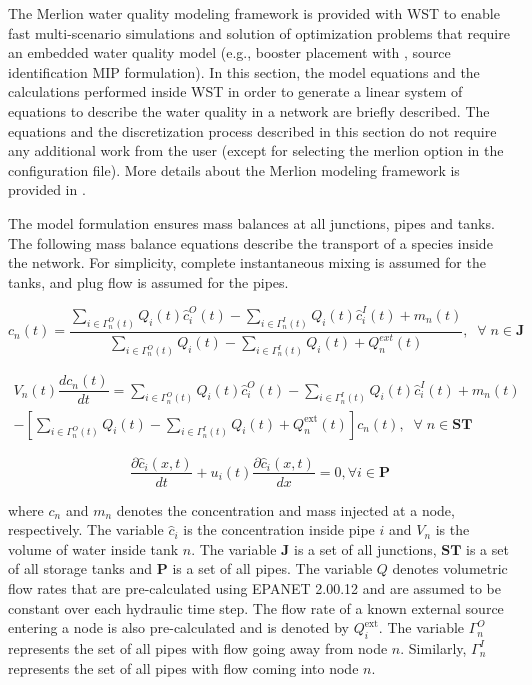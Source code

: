 The Merlion water quality modeling framework is provided with WST to enable
fast multi-scenario simulations and solution of optimization problems that require
an embedded water quality model (e.g., booster placement with , source identification MIP formulation). 
In this section, the model equations and the calculations performed inside WST 
in order to generate a linear system of equations to describe the water
quality in a network are briefly described. The equations and the discretization process described in 
this section do not require any additional work from the user (except for selecting the merlion 
option in the configuration file). More details about the Merlion modeling framework is provided in \citep{Merlion12}.   
      
The model formulation ensures mass balances
at all junctions, pipes and tanks. The following mass balance equations
describe the transport of a species inside the network. For simplicity,
complete instantaneous mixing is assumed for the tanks, and plug flow
is assumed for the pipes.

\bigskip{}

\begin{equation}
c_{n}(t)=\dfrac{\sum_{i\in\Gamma_{n}^{O}(t)}Q_{i}(t)\hat{c}_{i}^{O}(t)-\sum_{i\in\Gamma_{n}^{I}(t)}Q_{i}(t)\hat{c}_{i}^{I}(t)+m_{n}(t)}{\sum_{i\in\Gamma_{n}^{O}(t)}Q_{i}(t)-\sum_{i\in\Gamma_{n}^{I}(t)}Q_{i}(t)+Q_{n}^{ext}(t)},\;\;\forall\;
n\in\mathbf{J} \label{eq:junctionbalance}
\end{equation}

\medskip{}

\begin{multline}
V_{n}(t)\dfrac{dc_{n}(t)}{dt}=\sum_{i\in\Gamma_{n}^{O}(t)}Q_{i}(t)\hat{c}_{i}^{O}(t)-\sum_{i\in\Gamma_{n}^{I}(t)}Q_{i}(t)\hat{c}_{i}^{I}(t)+m_{n}(t)\\
-\left[\sum_{i\in\Gamma_{n}^{O}(t)}Q_{i}(t)-\sum_{i\in\Gamma_{n}^{I}(t)}Q_{i}(t)+Q_{n}^{\mathrm{ext}}(t)\right]c_{n}(t),\;\;\forall\; n\in\mathbf{ST}\label{eq:tankbalance}
\end{multline}

\bigskip{}

\begin{equation}
\dfrac{\partial\hat{c}_{i}(x,t)}{dt}+u_{i}(t)\dfrac{\partial\hat{c}_{i}(x,t)}{dx}=0,\forall i\in\mathbf{P}\label{eq:pipebalance}
\end{equation}

where $c_{n}$ and $m_{n}$ denotes the concentration and mass injected at a node,
respectively. The variable $\hat{c}_{i}$ is the concentration inside pipe $i$ 
and $V_{n}$ is the volume of water inside tank $n$.
The variable $\mathbf{{J}}$ is a set of all junctions, $\mathbf{{ST}}$
is a set of all storage tanks and $\mathbf{{P}}$ is a set of all
pipes. The variable $Q$ denotes volumetric flow rates that are pre-calculated using
EPANET 2.00.12 and are assumed to be constant over each hydraulic time step.
The flow rate of a known external source entering a node is also pre-calculated
and is denoted by $Q_{i}^{\mathrm{ext}}$. The variable $\Gamma_{n}^{O}$ represents the
set of all pipes with flow going away from node $n$. Similarly,
$\Gamma_{n}^{I}$ represents the set of all pipes with flow coming
into node $n$. 

